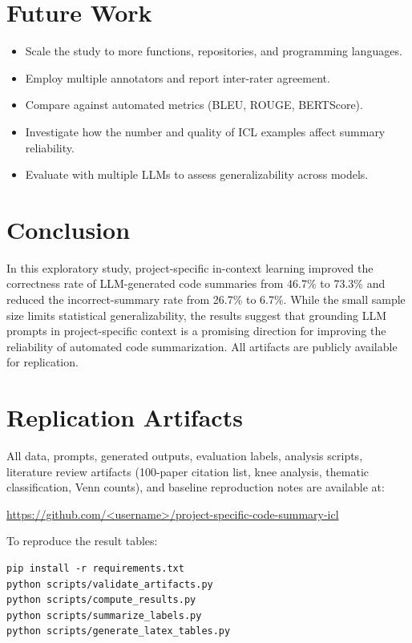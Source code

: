 \documentclass[conference]{IEEEtran}
\begin{document}
\section{Future Work}
\label{sec:future-work}

\begin{itemize}
  \item Scale the study to more functions, repositories, and programming
    languages.
  \item Employ multiple annotators and report inter-rater agreement.
  \item Compare against automated metrics (BLEU, ROUGE, BERTScore).
  \item Investigate how the number and quality of ICL examples affect
    summary reliability.
  \item Evaluate with multiple LLMs to assess generalizability across models.
\end{itemize}

\section{Conclusion}
\label{sec:conclusion}

In this exploratory study, project-specific in-context learning improved the
correctness rate of LLM-generated code summaries from 46.7\% to 73.3\% and
reduced the incorrect-summary rate from 26.7\% to 6.7\%. While the small
sample size limits statistical generalizability, the results suggest that
grounding LLM prompts in project-specific context is a promising direction
for improving the reliability of automated code summarization. All artifacts
are publicly available for replication.

\section*{Replication Artifacts}

All data, prompts, generated outputs, evaluation labels, analysis scripts,
literature review artifacts (100-paper citation list, knee analysis, thematic
classification, Venn counts), and baseline reproduction notes are available at:

\begin{center}
\url{https://github.com/<username>/project-specific-code-summary-icl}
\end{center}

To reproduce the result tables:
\begin{verbatim}
pip install -r requirements.txt
python scripts/validate_artifacts.py
python scripts/compute_results.py
python scripts/summarize_labels.py
python scripts/generate_latex_tables.py
\end{verbatim}



\end{document}
